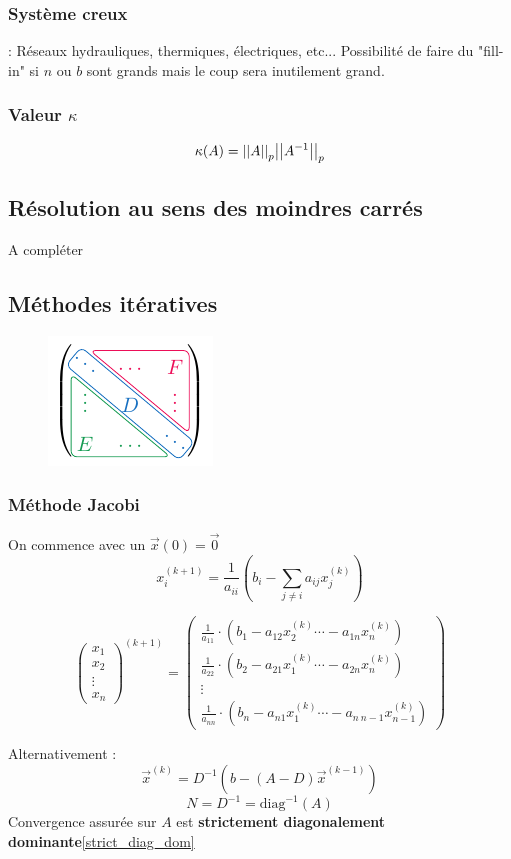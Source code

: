 \documentclass[resume]{subfiles}
\begin{document}
\subsubsection{Système creux} : Réseaux hydrauliques, thermiques, électriques, etc... Possibilité de faire du "fill-in" si $n$ ou $b$ sont grands mais le coup sera inutilement grand.
\subsubsection{Valeur $\kappa$}
$$\kappa(A)=\abs{\abs{A}}_p\abs{\abs{A^{-1}}}_p$$
\subsection{Résolution au sens des moindres carrés}
A compléter
\subsection{Méthodes itératives}
\begin{figure}[H]
\centering
\includegraphics[scale=1,page=1]{drwg_2.pdf}
\end{figure}
\subsubsection{Méthode Jacobi}
On commence avec un $\vec{x}(0)=\vec{0}$
$$x_i^{(k+1)}=\frac{1}{a_{ii}}\left(b_i-\sum_{j\neq i}a_{ij}x_j^{(k)}\right)$$
\begin{small}
$$\boxed{\begin{pmatrix}x_1\\x_2\\\vdots\\x_n\end{pmatrix}^{(k+1)}=\begin{pmatrix}
\frac{1}{a_{11}}\cdot(b_1-a_{12}x_2^{(k)} \cdots -a_{1n}x_n^{(k)})\\
\frac{1}{a_{22}}\cdot(b_2-a_{21}x_1^{(k)} \cdots -a_{2n}x_n^{(k)})\\
\vdots\\
\frac{1}{a_{nn}}\cdot(b_n-a_{n1}x_1^{(k)} \cdots -a_{n\ n-1}x_{n-1}^{(k)})
\end{pmatrix}}$$
\end{small}
Alternativement :
$$\boxed{\vec{x}^{(k)}=D^{-1}\left(b-(A-D)\vec{x}^{(k-1)}\right)}$$
$$N=D^{-1}=\text{diag}^{-1}(A)$$
Convergence assurée sur $A$ est \textbf{strictement diagonalement dominante}\ref{strict_diag_dom}
\end{document}
